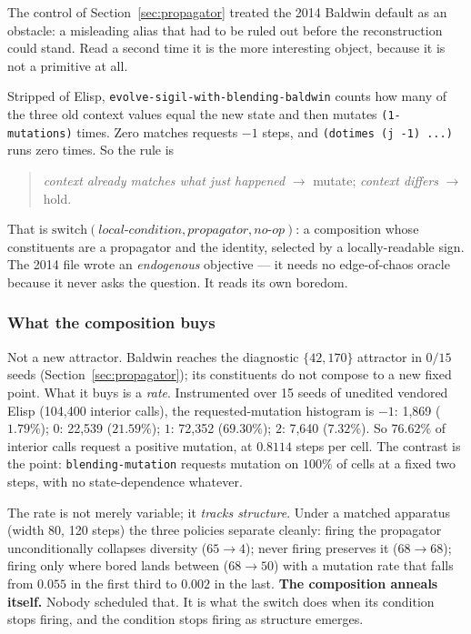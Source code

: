 \documentclass[man,12pt,floatsintext]{apa7}
\begin{document}
The control of Section~\ref{sec:propagator} treated the 2014 Baldwin default as
an obstacle: a misleading alias that had to be ruled out before the
reconstruction could stand. Read a second time it is the more interesting
object, because it is not a primitive at all.

Stripped of Elisp, \texttt{evolve-sigil-with-blending-baldwin} counts how many of
the three old context values equal the new state and then mutates
\texttt{(1- mutations)} times. Zero matches requests $-1$ steps, and
\texttt{(dotimes (j -1) ...)} runs zero times. So the rule is
\begin{quote}
  \emph{context already matches what just happened} $\rightarrow$ mutate;\quad
  \emph{context differs} $\rightarrow$ hold.
\end{quote}
That is $\mathrm{switch}(\textit{local-condition}, \textit{propagator},
\textit{no-op})$: a composition whose constituents are a propagator and the
identity, selected by a locally-readable sign. The 2014 file wrote an
\emph{endogenous} objective --- it needs no edge-of-chaos oracle because it never
asks the question. It reads its own boredom.

\subsubsection{What the composition buys}
\label{sec:compositions}

Not a new attractor. Baldwin reaches the diagnostic $\{42,170\}$ attractor in
$0/15$ seeds (Section~\ref{sec:propagator}); its constituents do not compose to a
new fixed point. What it buys is a \emph{rate}. Instrumented over 15 seeds of
unedited vendored Elisp (104{,}400 interior calls), the requested-mutation
histogram is $-1$: 1{,}869 ($1.79\%$); $0$: 22{,}539 ($21.59\%$); $1$: 72{,}352
($69.30\%$); $2$: 7{,}640 ($7.32\%$). So $76.62\%$ of interior calls request a
positive mutation, at $0.8114$ steps per cell. The contrast is the point:
\texttt{blending-mutation} requests mutation on $100\%$ of cells at a fixed two
steps, with no state-dependence whatever.

The rate is not merely variable; it \emph{tracks structure}. Under a matched
apparatus (width 80, 120 steps) the three policies separate cleanly:
firing the propagator unconditionally collapses diversity ($65 \rightarrow 4$);
never firing preserves it ($68 \rightarrow 68$); firing only where bored lands
between ($68 \rightarrow 50$) with a mutation rate that falls from $0.055$ in the
first third to $0.002$ in the last. \textbf{The composition anneals itself.}
Nobody scheduled that. It is what the switch does when its condition stops
firing, and the condition stops firing as structure emerges.
\end{document}
